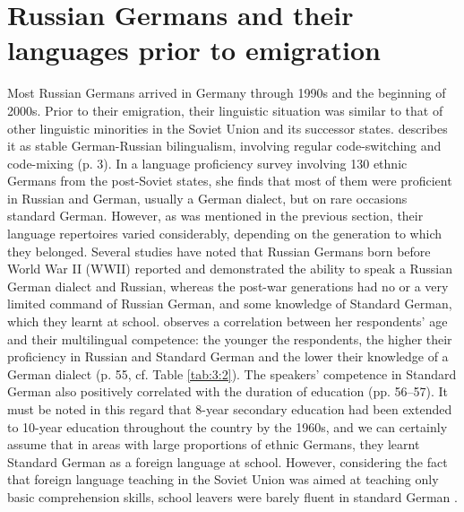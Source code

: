 \section{Russian Germans and their languages prior to emigration}{\label{ru-de}}
Most Russian Germans arrived in Germany through 1990s and the beginning of 2000s. Prior to their emigration, their linguistic situation was similar to that of other linguistic minorities in the Soviet Union and its successor states. \citet[]{berend98} describes it as stable German-Russian bilingualism, involving regular code-switching and code-mixing (p. 3). In a language proficiency survey involving 130 ethnic Germans from the post-Soviet states, she finds that most of them were proficient in Russian and German, usually a German dialect, but on rare occasions standard German. However, as was mentioned in the previous section, their language repertoires varied considerably, depending on the generation to which they belonged. Several studies \citep[e.g.,][]{dietz-hilkes1993, berend98, meng01, riehlTA} have noted that Russian Germans born before World War II (WWII) reported and demonstrated the ability to speak a Russian German dialect and Russian, whereas the post-war generations had no or a very limited command of Russian German, and some knowledge of Standard German, which they learnt at school. \citet{berend98} observes a correlation between her respondents' age and their multilingual competence: the younger the respondents, the higher their proficiency in Russian and Standard German and the lower their knowledge of a German dialect (p. 55, cf. Table \ref{tab:3:2}). The speakers' competence in Standard German also positively correlated with the duration of education (pp. 56--57). It must be noted in this regard that 8-year secondary education had been extended to 10-year education throughout the country by the 1960s, and we can certainly assume that in areas with large proportions of ethnic Germans, they learnt Standard German as a foreign language at school. However, considering the fact that foreign language teaching in the Soviet Union was aimed at teaching only basic comprehension skills, school leavers were barely fluent in standard German \citep[cf.][309]{ivanovaitivyaeva}.

